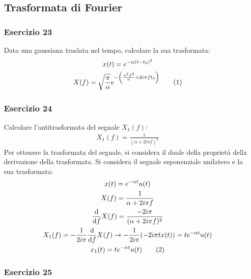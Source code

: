 \documentclass{article}
\newcommand{\df}{\mathrm{d}}
\newcommand{\tageq}{\tag{\stepcounter{equation}\theequation}}
\begin{document}
\subsection{Trasformata di Fourier}

\subsubsection*{Esercizio 23}

Data una gaussiana traslata nel tempo, calcolare la sua trasformata: 
\begin{gather*}
    x(t)=e^{-\alpha(t-t_0)^2}\\
    X(f)=\displaystyle\sqrt{\frac{\pi}{\alpha}}e^{-\left(\frac{\pi^2f^2}{\alpha}+2i\pi ft_0\right)}\tageq
\end{gather*}

\subsubsection*{Esercizio 24}

Calcolare l'antitrasformata del segnale $X_1(f)$: 
\begin{gather*}
    X_1(f)=\displaystyle\frac{1}{(\alpha+2i\pi f)^2}
\end{gather*}
Per ottenere la trasformata del segnale, si considera il duale della proprietà della derivazione della trasformata. Si considera il segnale esponenziale unilatero e la sua 
trasformata:
\begin{gather*}
    x(t)=e^{-\alpha t}u(t)\\
    X(f)=\displaystyle\frac{1}{\alpha+2i\pi f}\\
    \displaystyle\frac{\df}{\df f}X(f)=\frac{-2i\pi}{(\alpha+2i\pi f)^2}\\
    X_1(f)=\displaystyle-\frac{1}{2i\pi}\frac{\df}{\df f}X(f)\to-\frac{1}{2i\pi}(-2i\pi tx(t))=te^{-\alpha t}u(t)\\
    x_1(t)=te^{-\alpha t}u(t)\tageq
\end{gather*}

\subsubsection*{Esercizio 25}
\end{document}
